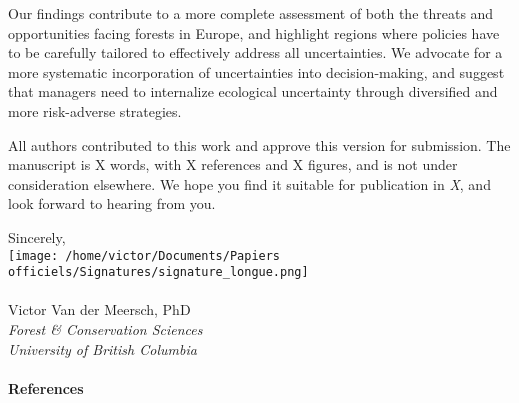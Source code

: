 \documentclass[11pt,a4paper]{article}
\begin{document}
\vspace{0.3cm}

\noindent Our findings contribute to a more complete assessment of both the threats and opportunities facing forests in Europe, and highlight regions where policies have to be carefully tailored to effectively address all uncertainties. We advocate for a more systematic incorporation of uncertainties into decision-making\supercite{Dawson2011, Urban2016, Saltelli2020}, and suggest that managers need to internalize ecological uncertainty through diversified and more risk-adverse strategies.

\vspace{0.3cm}

\noindent All authors contributed to this work and approve this version for submission. The manuscript is X words, with X references and X figures, and is not under consideration elsewhere. We hope you find it suitable for publication in \emph{X}, and look forward to hearing from you. 

\vspace{0.5cm}
\noindent Sincerely, \\
\hspace*{-0.5cm}
\texttt{[image: /home/victor/Documents/Papiers officiels/Signatures/signature\_longue.png]} \\
\vspace{-2cm}\\
\noindent Victor Van der Meersch, PhD\\
\noindent \emph{Forest \& Conservation Sciences}\\
\noindent \emph{University of British Columbia}

\clearpage

\paragraph{References}
\printbibliography[heading=none]


\newpage
\end{document}
